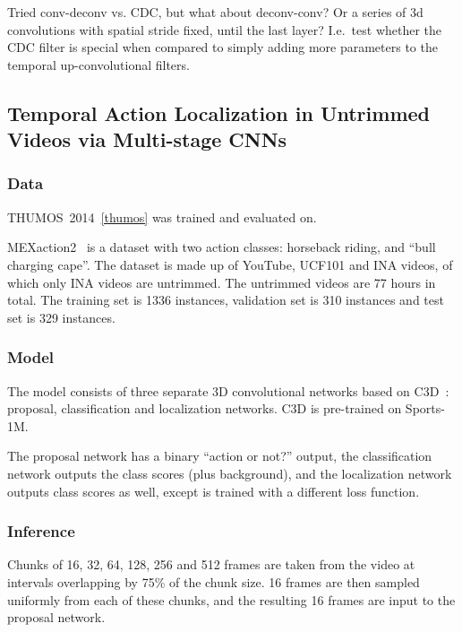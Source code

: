 \documentclass[a4paper, 12pt]{article}
\begin{document}
Tried conv-deconv vs. CDC, but what about deconv-conv? Or a series of 3d
convolutions with spatial stride fixed, until the last layer? I.e.\ test
whether the CDC filter is special when compared to simply adding more
parameters to the temporal up-convolutional filters.


\subsection{Temporal Action Localization in Untrimmed Videos via Multi-stage
            CNNs~\citet{DBLP:journals/corr/ShouWC16}}

\subsubsection{Data}

THUMOS~2014~\ref{thumos} was trained and evaluated on.

MEXaction2~\citet{MEXaction2} is a dataset with two action classes: horseback
riding, and ``bull charging cape''. The dataset is made up of YouTube, UCF101
and INA videos, of which only INA videos are untrimmed. The untrimmed videos
are 77 hours in total. The training set is 1336 instances, validation set is
310 instances and test set is 329 instances.

\subsubsection{Model}

The model consists of three separate 3D convolutional networks based
on C3D~\citet{DBLP:journals/corr/TranBFTP14}: proposal, classification and
localization networks. C3D is pre-trained on Sports-1M.

The proposal network has a binary ``action or not?'' output, the classification
network outputs the class scores (plus background), and the localization
network outputs class scores as well, except is trained with a different loss
function.

\subsubsection{Inference}

Chunks of 16, 32, 64, 128, 256 and 512 frames are taken from the video at
intervals overlapping by 75\% of the chunk size. 16 frames are then sampled
uniformly from each of these chunks, and the resulting 16 frames are input to
the proposal network.
\end{document}
